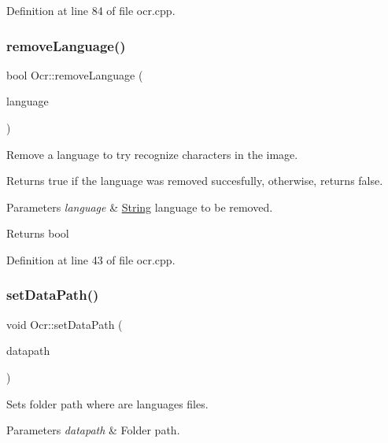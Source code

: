 Definition at line 84 of file ocr.\+cpp.

\mbox{\label{classOcr_a76001048da750374c987bef8171f1977}} 
\subsubsection{\texorpdfstring{remove\+Language()}{removeLanguage()}}
{\footnotesize\ttfamily bool Ocr\+::remove\+Language (\begin{DoxyParamCaption}\item[{const Q\+String \&}]{language }\end{DoxyParamCaption})\hspace{0.3cm}{\ttfamily [virtual]}}



Remove a language to try recognize characters in the image. 

Returns true if the language was removed succesfully, otherwise, returns false. 
\begin{DoxyParams}{Parameters}
{\em language} & \mbox{\hyperlink{classString}{String}} language to be removed. \\
\hline
\end{DoxyParams}
\begin{DoxyReturn}{Returns}
bool 
\end{DoxyReturn}


Definition at line 43 of file ocr.\+cpp.

\mbox{\label{classOcr_a0ec269340072accaa9d0932699b2a8ef}} 
\subsubsection{\texorpdfstring{set\+Data\+Path()}{setDataPath()}}
{\footnotesize\ttfamily void Ocr\+::set\+Data\+Path (\begin{DoxyParamCaption}\item[{const Q\+String \&}]{datapath }\end{DoxyParamCaption})}



Sets folder path where are languages files. 


\begin{DoxyParams}{Parameters}
{\em datapath} & Folder path. \\
\hline
\end{DoxyParams}


